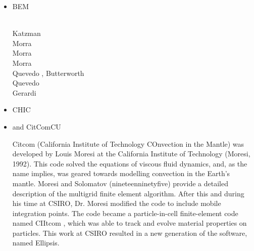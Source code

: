 \begin{itemize}
\item {\codefont BEM} 

\begin{scriptsize}
\cite{crsr83}\\
Katzman \etal \cite{katl95}\\
Morra \etal \cite{moct07}\\
Morra \etal \cite{moct09}\\
Morra \etal \cite{moyb10}\\
Quevedo \etal \cite{qumm12}, Butterworth \etal \cite{buqm12}\\
Quevedo \etal \cite{quhm13}\\
Gerardi \etal \cite{gert19}
\end{scriptsize}

\item {\codefont CHIC}  

\begin{scriptsize}
\cite{norv15}
\end{scriptsize}

\item \citcoms and {\codefont CitComCU} 

Citcom (California Institute of Technology COnvection in the Mantle) was  developed by Louis
Moresi at the California Institute of Technology (Moresi, 1992). This code solved the equations
of viscous fluid dynamics, and, as the name implies, was geared towards modelling convection in
the Earth’s mantle. Moresi and Solomatov (nineteenninetyfive) provide a detailed description of the multigrid
finite element algorithm. After this and during his time at CSIRO, Dr. Moresi modified the code to
include mobile integration points. The code became a particle-in-cell finite-element code named
CIItcom , which was able to track and evolve material properties on particles. This work at
CSIRO resulted in a new generation of the software, named Ellipsis.


\end{itemize}
